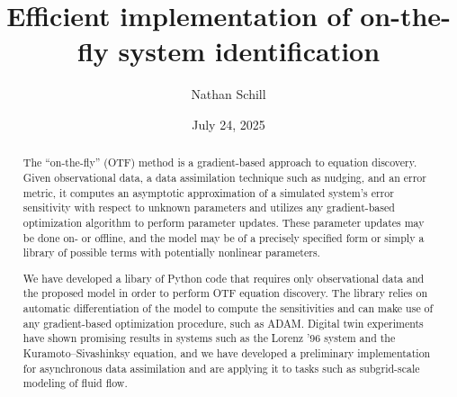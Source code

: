 \documentclass[12pt]{article}
\title{Efficient implementation of on-the-fly system identification}
\author{Nathan Schill}
\date{July 24, 2025}
\begin{document}
\maketitle

\begin{abstract}
  The ``on-the-fly'' (OTF) method is a gradient-based approach to equation discovery.
  Given observational data, a data assimilation technique such as nudging, and an error metric, it computes an asymptotic approximation of a simulated system's error sensitivity with respect to unknown parameters and utilizes any gradient-based optimization algorithm to perform parameter updates.
  These parameter updates may be done on- or offline, and the model may be of a precisely specified form or simply a library of possible terms with potentially nonlinear parameters.

  We have developed a libary of Python code that requires only observational data and the proposed model in order to perform OTF equation discovery.
  The library relies on automatic differentiation of the model to compute the sensitivities and can make use of any gradient-based optimization procedure, such as ADAM.
  Digital twin experiments have shown promising results in systems such as the Lorenz '96 system and the Kuramoto--Sivashinksy equation, and we have developed a preliminary implementation for asynchronous data assimilation and are applying it to tasks such as subgrid-scale modeling of fluid flow.
\end{abstract}
\end{document}
